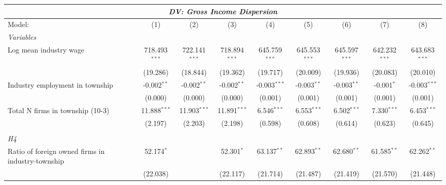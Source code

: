 \begingroup
\centering
\begin{tabular}{lcccccccc}
   \tabularnewline \multicolumn{9}{c}{\textit{DV: Gross Income Dispersion}} \\ \midrule \midrule
   Model:                                                & (1)             & (2)             & (3)             & (4)              & (5)              & (6)              & (7)              & (8)\\  
   \midrule
   \emph{Variables}\\
   Log mean industry wage                                & 718.493$^{***}$ & 722.141$^{***}$ & 718.894$^{***}$ & 645.759$^{***}$  & 645.553$^{***}$  & 645.597$^{***}$  & 642.232$^{***}$  & 643.683$^{***}$\\   
                                                         & (19.286)        & (18.844)        & (19.362)        & (19.717)         & (20.009)         & (19.936)         & (20.083)         & (20.010)\\   
   Industry employment in township                       & -0.002$^{**}$   & -0.002$^{**}$   & -0.002$^{**}$   & -0.003$^{***}$   & -0.003$^{**}$    & -0.003$^{**}$    & -0.001$^{*}$     & -0.003$^{***}$\\   
                                                         & (0.000)         & (0.000)         & (0.000)         & (0.001)          & (0.001)          & (0.001)          & (0.001)          & (0.001)\\   
   Total N firms in township (10-3)                      & 11.888$^{***}$  & 11.903$^{***}$  & 11.891$^{***}$  & 6.546$^{***}$    & 6.553$^{***}$    & 6.502$^{***}$    & 7.330$^{***}$    & 6.453$^{***}$\\   
                                                         & (2.197)         & (2.203)         & (2.198)         & (0.598)          & (0.608)          & (0.614)          & (0.623)          & (0.645)\\   
\hdashline %
\\[0.1ex] %
\emph{H4} \\ 
   Ratio of foreign owned firms in industry-township     & 52.174$^{*}$    &                 & 52.301$^{*}$    & 63.137$^{**}$    & 62.893$^{**}$    & 62.680$^{**}$    & 61.585$^{**}$    & 62.262$^{**}$\\   
                                                         & (22.038)        &                 & (22.117)        & (21.714)         & (21.487)         & (21.419)         & (21.570)         & (21.448)\\   

\end{tabular}

